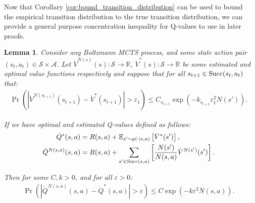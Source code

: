 \documentclass{article}
\newcommand{\bb}[1]{\mathbb{#1}}
\newcommand{\cl}[1]{\mathcal{#1}}
\newcommand{\succc}[2]{\textnormal{Succ}(#1,#2)}
\theoremstyle{plain}
\newtheorem{lemma}[theorem]{Lemma}
\begin{document}
\begin{appendices}
    
    






    
    
        Now that Corollary \ref{cor:bound_transition_distribution} can be used to bound  the empirical transition distribution to the true transition distribution, we can provide a general purpose concentration inequality for Q-values to use in later proofs.
        
        \begin{lemma} \label{lem:stochastic_step}
            Consider any Boltzmann MCTS process, and some state action pair $(s_t,a_t)\in\cl{S}\times\cl{A}$. Let $\dot{V}^{N(s)}(s):\cl{S}\rightarrow \bb{R}$, $\dot{V}^*(s):\cl{S}\rightarrow \bb{R}$ be some estimated and optimal value functions respectively and suppose that for all $s_{t+1}\in\succc{s_t}{a_t}$ that:
            \begin{align}
                \Pr\left(\left| \dot{V}^{N(s_{t+1})}(s_{t+1}) - \dot{V}^*(s_{t+1}) \right| > \varepsilon_1 \right) \leq C_{s_{t+1}}\exp(-k_{s_{t+1}}\varepsilon_1^2 N(s')).
            \end{align}
            
            If we have optimal and estimated Q-values defined as follows: 
            \begin{align}
                \dot{Q}^*(s,a)&=R(s,a)+\bb{E}_{s'\sim p(\cdot|s,a)}\left[\dot{V}^*(s')\right], \\
                \dot{Q}^{N(s,a)}(s,a)&=R(s,a)+\sum_{s'\in\succc{s}{a}} \left[\frac{N(s')}{N(s,a)} \dot{V}^{N(s')}(s')\right].
            \end{align}
            
            Then for some $C,k>0$, and for all $\varepsilon>0$:
            \begin{align}
                \Pr\left(\left| \dot{Q}^{N(s,a)}(s,a) - \dot{Q}^*(s,a) \right| > \varepsilon \right) \leq C\exp(-k\varepsilon^2 N(s,a)).
            \end{align}
        \end{lemma}
        

\end{appendices}
\end{document}
